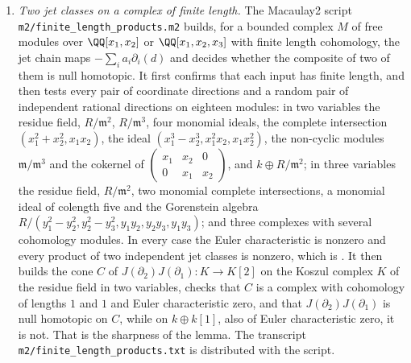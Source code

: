 \begin{enumerate}[label=\textup{(\Roman*)},leftmargin=*]
\item \emph{Two jet classes on a complex of finite length.} The Macaulay2
  script \texttt{m2/finite\_\allowbreak length\_\allowbreak products.m2}
  builds, for a bounded complex $M$ of free modules over $\QQ[x_{1},x_{2}]$ or
  $\QQ[x_{1},x_{2},x_{3}]$ with finite length cohomology, the jet chain maps
  $-\sum_{i}a_{i}\partial_{i}(d)$ and decides whether the composite of two of
  them is null homotopic. It first confirms that each input has finite
  length, and then tests every pair of coordinate directions and a random
  pair of independent rational directions on eighteen modules: in two
  variables the residue field, $R/\mathfrak{m}^{2}$, $R/\mathfrak{m}^{3}$,
  four monomial ideals, the complete intersection
  $(x_{1}^{2}+x_{2}^{2},x_{1}x_{2})$, the ideal
  $(x_{1}^{3}-x_{2}^{3},x_{1}^{2}x_{2},x_{1}x_{2}^{2})$, the non-cyclic
  modules $\mathfrak{m}/\mathfrak{m}^{3}$ and the cokernel of
  $\left(\begin{smallmatrix}x_{1}&x_{2}&0\\0&x_{1}&x_{2}\end{smallmatrix}\right)$,
  and $k\oplus R/\mathfrak{m}^{2}$; in three variables the residue field,
  $R/\mathfrak{m}^{2}$, two monomial complete intersections, a monomial
  ideal of colength five and the Gorenstein algebra
  $R/(y_{1}^{2}-y_{2}^{2},y_{2}^{2}-y_{3}^{2},y_{1}y_{2},y_{2}y_{3},y_{1}y_{3})$;
  and three complexes with several cohomology modules. In every case the
  Euler characteristic is nonzero and every product of two independent jet
  classes is nonzero, which is . It then builds the
  cone $C$ of $J(\partial_{2})J(\partial_{1})\colon K\to K[2]$ on the Koszul
  complex $K$ of the residue field in two variables, checks that $C$ is a
  complex with cohomology of lengths $1$ and $1$ and Euler characteristic
  zero, and that $J(\partial_{2})J(\partial_{1})$ is null homotopic on $C$,
  while on $k\oplus k[1]$, also of Euler characteristic zero, it is not. That
  is the sharpness of the lemma. The transcript
  \texttt{m2/finite\_\allowbreak length\_\allowbreak products.txt} is
  distributed with the script.


\end{enumerate}
